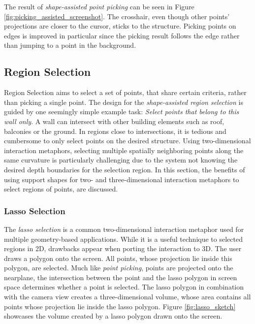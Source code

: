 The result of \textit{shape-assisted point picking} can be seen in Figure \ref{fig:picking_assisted_screenshot}. The crosshair, even though other points' projections are closer to the cursor, sticks to the structure. Picking points on edges is improved in particular since the picking result follows the edge rather than jumping to a point in the background. 


\subsection{Region Selection}
\label{sec:regionSelection}

Region Selection aims to select a set of points, that share certain criteria, rather than picking a single point. 
The design for the \textit{shape-assisted region selection} is guided by one seemingly simple example task: \textit{Select points that belong to this wall only}. A wall can intersect with other building elements such as roof, balconies or the ground. In regions close to intersections, it is tedious and cumbersome to only select points on the desired structure. Using two-dimensional interaction metaphors, selecting multiple spatially neighboring points along the same curvature is particularly challenging due to the system not knowing the desired depth boundaries for the selection region. In this section, the benefits of using support shapes for two- and three-dimensional interaction metaphors to select regions of points,  are discussed. 


\subsubsection{Lasso Selection}

The \textit{lasso selection} is a common two-dimensional interaction metaphor used for multiple geometry-based applications. While it is a useful technique to selected regions in 2D, drawbacks appear when porting the interaction to 3D. The user draws a polygon onto the screen. All points, whose projection lie inside this polygon, are selected. Much like \textit{point picking}, points are projected onto the nearplane, the intersection between the point and the lasso polygon in screen space determines whether a point is selected. The lasso polygon in combination with the camera view creates a three-dimensional volume, whose area contains all points whose projection lie inside the lasso polygon. Figure \ref{fig:lasso_sketch} showcases the volume created by a lasso polygon drawn onto the screen.

